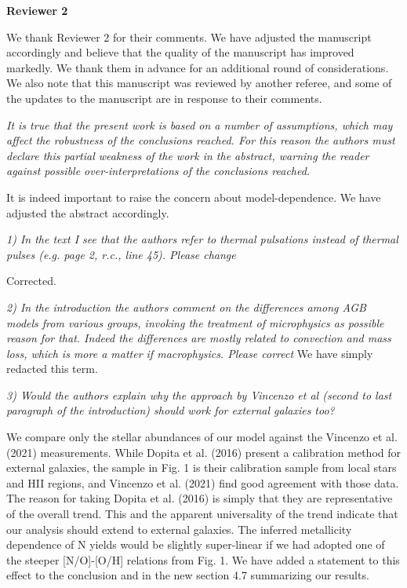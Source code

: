 \documentclass[12pt]{article}
\newcommand\doublebreak[0]{\par\null\par\noindent}
\begin{document}
\newpage
\begin{center}
\textbf{Reviewer 2}
\makebox[\linewidth]{\rule{0.5\textwidth}{0.4pt}}
\end{center}
\par\noindent
We thank Reviewer 2 for their comments.
We have adjusted the manuscript accordingly and believe that the quality of the
manuscript has improved markedly.
We thank them in advance for an additional round of considerations.
We also note that this manuscript was reviewed by another referee, and some of
the updates to the manuscript are in response to their comments.
\doublebreak
\textit{%
It is true that the present
work is based on a number of assumptions, which may affect the robustness of the
conclusions reached. For this reason the authors must declare this partial
weakness of the work in the abstract, warning the reader against possible
over-interpretations of the conclusions reached.
}
\doublebreak
It is indeed important to raise the concern about model-dependence.
We have adjusted the abstract accordingly.
\doublebreak
\textit{%
1) In the text I see that the authors refer to thermal pulsations instead of
thermal pulses (e.g. page 2, r.c., line 45). Please change
}
\doublebreak
Corrected.
\doublebreak
\textit{%
2) In the introduction the authors comment on the differences among AGB models
from various groups, invoking the treatment of microphysics as possible reason
for that.
Indeed the differences are mostly related to convection and mass loss, which is
more a matter if macrophysics. Please correct
}
We have simply redacted this term.
\doublebreak
\textit{%
3) Would the authors explain why the approach by Vincenzo et al (second to last
paragraph of the introduction) should work for external galaxies too?
}
\doublebreak
We compare only the stellar abundances of our model against the Vincenzo et al.
(2021) measurements.
While Dopita et al. (2016) present a calibration method for external galaxies,
the sample in Fig. 1 is their calibration sample from local stars and HII
regions, and Vincenzo et al. (2021) find good agreement with those data.
The reason for taking Dopita et al. (2016) is simply that they are
representative of the overall trend.
This and the apparent universality of the trend indicate that our analysis
should extend to external galaxies.
The inferred metallicity dependence of N yields would be slightly super-linear
if we had adopted one of the steeper [N/O]-[O/H] relations from Fig. 1.
We have added a statement to this effect to the conclusion and in the new
section 4.7 summarizing our results.
\doublebreak
\end{document}
